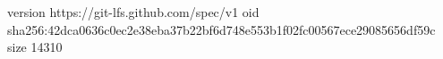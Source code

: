 version https://git-lfs.github.com/spec/v1
oid sha256:42dca0636c0ec2e38eba37b22bf6d748e553b1f02fc00567ece29085656df59c
size 14310
